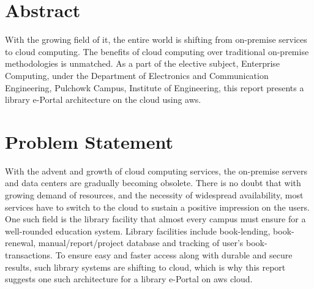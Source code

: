 \documentclass{home_assignment}
\begin{document}
    \section*{Abstract}
    With the growing field of \acrfull{it}, the entire world is shifting from on-premise services to cloud computing. The benefits of cloud computing over traditional on-premise methodologies is unmatched. As a part of the elective subject, Enterprise Computing, under the Department of Electronics and Communication Engineering, Pulchowk Campus, Institute of Engineering, this report presents a library e-Portal architecture on the cloud using \acrfull{aws}.
    \clearpage
    \tableofcontents
    \clearpage
    \listoffigures
    \clearpage
    \printglossary[type=\acronymtype,nonumberlist,title={List of Abbreviations}]
    \clearpage
    \section{Problem Statement}
    With the advent and growth of cloud computing services, the on-premise servers and data centers are gradually becoming obsolete. There is no doubt that with growing demand of resources, and the necessity of widespread availability, most services have to switch to the cloud to sustain a positive impression on the users. One such field is the library facility that almost every campus must ensure for a well-rounded education system. Library facilities include book-lending, book-renewal, manual/report/project database and tracking of user's book-transactions. To ensure easy and faster access along with durable and secure results, such library systems are shifting to cloud, which is why this report suggests one such architecture for a library e-Portal on \acrshort{aws} cloud.
\end{document}
